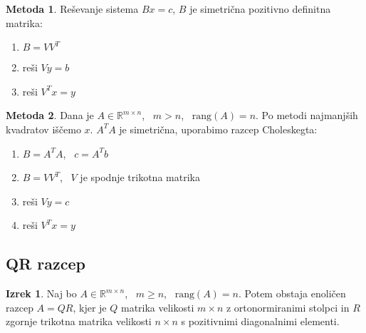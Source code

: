\documentclass[11pt]{article}
\theoremstyle{definition}
\newtheorem{izrek}{Izrek}
\newtheorem*{metoda}{Metoda}
\begin{document}
\begin{metoda}

Reševanje sistema $Bx = c$, $B$ je simetrična pozitivno definitna matrika:
\begin{enumerate}
	\item $B = V V^T$
	\item reši $V y = b$
	\item reši $V^T x = y$
\end{enumerate}

\end{metoda}
\vspace{0.5cm}

\begin{metoda}

Dana je $A \in \mathbb{R}^{m \times n}$, ~$m > n$, ~$\text{rang}(A) = n$. Po metodi najmanjših kvadratov iščemo $x$. $A^T A$ je simetrična, uporabimo razcep Choleskegta:
\begin{enumerate}
	\item $B = A^T A$, ~$c = A^T b$
	\item $B = V V^T$, ~$V$ je spodnje trikotna matrika
	\item reši $V y = c$
	\item reši $V^T x = y$
\end{enumerate}

\end{metoda}
\vspace{0.5cm}


\subsection{QR razcep}
\vspace{0.5cm}

\begin{izrek}

Naj bo $A \in \mathbb{R}^{m \times n}$, ~$m \geq n$, ~$\text{rang}(A) = n$. Potem obstaja enoličen razcep $A = QR$, kjer je $Q$ matrika velikosti $m \times n$ z ortonormiranimi stolpci in $R$ zgornje trikotna matrika velikosti $n \times n$ s pozitivnimi diagonalnimi elementi.

\end{izrek}
\vspace{0.5cm}
\end{document}
